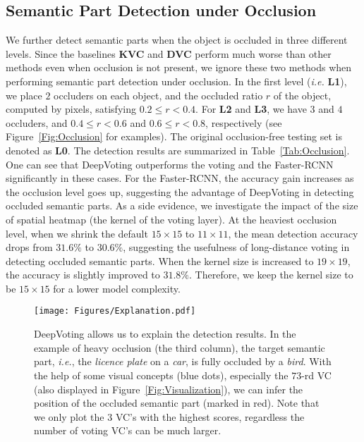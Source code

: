 \documentclass[10pt,twocolumn,letterpaper]{article}
\begin{document}
  \subsection{Semantic Part Detection under Occlusion}
  \label{Experiments:Occlusion}
  We further detect semantic parts when the object is occluded in three different levels. Since the baselines {\bf KVC} and {\bf DVC} perform much worse than other methods even when occlusion is not present, we ignore these two methods when performing semantic part detection under occlusion. In the first level ({\em i.e.} {\bf L1}), we place $2$ occluders on each object, and the occluded ratio $r$ of the object, computed by pixels, satisfying ${0.2}\leqslant{r}<{0.4}$. For {\bf L2} and {\bf L3}, we have $3$ and $4$ occluders, and ${0.4}\leqslant{r}<{0.6}$ and ${0.6}\leqslant{r}<{0.8}$, respectively (see Figure~\ref{Fig:Occlusion} for examples). The original occlusion-free testing set is denoted as {\bf L0}. The detection results are summarized in Table~\ref{Tab:Occlusion}. One can see that DeepVoting outperforms the voting and the Faster-RCNN significantly in these cases. For the Faster-RCNN, the accuracy gain increases as the occlusion level goes up, suggesting the advantage of DeepVoting in detecting occluded semantic parts. As a side evidence, we investigate the impact of the size of spatial heatmap (the kernel of the voting layer). At the heaviest occlusion level, when we shrink the default $15\times15$ to $11\times11$, the mean detection accuracy drops from $31.6\%$ to $30.6\%$, suggesting the usefulness of long-distance voting in detecting occluded semantic parts. When the kernel size is increased to $19\times19$, the accuracy is slightly improved to $31.8\%$. Therefore, we keep the kernel size to be $15\times15$ for a lower model complexity.

  \begin{figure*}[!tp]
  \centering
  \texttt{[image: Figures/Explanation.pdf]}
  \caption{
  DeepVoting allows us to explain the detection results. In the example of heavy occlusion (the third column), the target semantic part, {\em i.e.}, the {\em licence plate} on a {\em car}, is fully occluded by a {\em bird}. With the help of some visual concepts (blue dots), especially the $73$-rd VC (also displayed in Figure~\ref{Fig:Visualization}), we can infer the position of the occluded semantic part (marked in red). Note that we only plot the $3$ VC's with the highest scores, regardless the number of voting VC's can be much larger.
  }
  \label{Fig:Explanation}
  \end{figure*}
\end{document}
